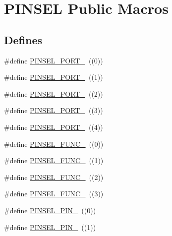 \hypertarget{group___p_i_n_s_e_l___public___macros}{\section{\-P\-I\-N\-S\-E\-L \-Public \-Macros}
\label{group___p_i_n_s_e_l___public___macros}
}
\subsection*{\-Defines}
\begin{DoxyCompactItemize}
\item 
\#define \hyperlink{group___p_i_n_s_e_l___public___macros_ga6be60e77a74899c8c3050a5c7154765a}{\-P\-I\-N\-S\-E\-L\-\_\-\-P\-O\-R\-T\-\_}~((0))
\item 
\#define \hyperlink{group___p_i_n_s_e_l___public___macros_gaaba832d2345e3a06cf0cdb1ae0d43999}{\-P\-I\-N\-S\-E\-L\-\_\-\-P\-O\-R\-T\-\_}~((1))
\item 
\#define \hyperlink{group___p_i_n_s_e_l___public___macros_ga55f9eb45dba730f6d830777fbab15a72}{\-P\-I\-N\-S\-E\-L\-\_\-\-P\-O\-R\-T\-\_}~((2))
\item 
\#define \hyperlink{group___p_i_n_s_e_l___public___macros_ga43b2bbfbf55bdd716e4d1443ad072bd1}{\-P\-I\-N\-S\-E\-L\-\_\-\-P\-O\-R\-T\-\_}~((3))
\item 
\#define \hyperlink{group___p_i_n_s_e_l___public___macros_ga5d5da051e602bac852b777c4d9491776}{\-P\-I\-N\-S\-E\-L\-\_\-\-P\-O\-R\-T\-\_}~((4))
\item 
\#define \hyperlink{group___p_i_n_s_e_l___public___macros_ga52e96a68181b78213b671c5fe8d60d33}{\-P\-I\-N\-S\-E\-L\-\_\-\-F\-U\-N\-C\-\_}~((0))
\item 
\#define \hyperlink{group___p_i_n_s_e_l___public___macros_gaf39d280a01f6c478d2a16996310c8754}{\-P\-I\-N\-S\-E\-L\-\_\-\-F\-U\-N\-C\-\_}~((1))
\item 
\#define \hyperlink{group___p_i_n_s_e_l___public___macros_ga658a961b569678308932fbdd1d5957c3}{\-P\-I\-N\-S\-E\-L\-\_\-\-F\-U\-N\-C\-\_}~((2))
\item 
\#define \hyperlink{group___p_i_n_s_e_l___public___macros_ga5a5529a534b46ba5e033fadd16307033}{\-P\-I\-N\-S\-E\-L\-\_\-\-F\-U\-N\-C\-\_}~((3))
\item 
\#define \hyperlink{group___p_i_n_s_e_l___public___macros_ga4cfdfb0d67ab68ce0c9b942b451a072b}{\-P\-I\-N\-S\-E\-L\-\_\-\-P\-I\-N\-\_}~((0))
\item 
\#define \hyperlink{group___p_i_n_s_e_l___public___macros_gaab8dd29478207b88054c7069d7cbdddf}{\-P\-I\-N\-S\-E\-L\-\_\-\-P\-I\-N\-\_}~((1))

\end{DoxyCompactItemize}
